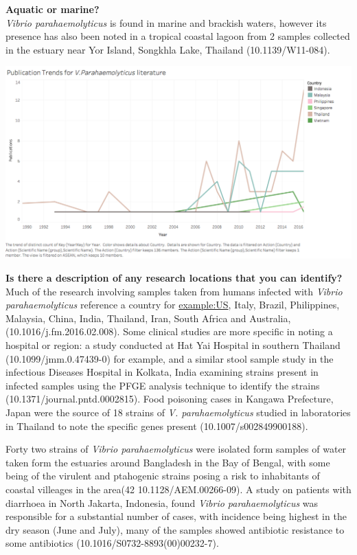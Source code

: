 \documentclass[]{book}
\theoremstyle{definition}
\theoremstyle{definition}
\theoremstyle{definition}
\theoremstyle{remark}
\begin{document}
\textbf{Aquatic or marine?}\\
\emph{Vibrio parahaemolyticus} is found in marine and brackish waters,
however its presence has also been noted in a tropical coastal lagoon
from 2 samples collected in the estuary near Yor Island, Songkhla Lake,
Thailand (10.1139/W11-084).

\includegraphics{images_species/publication trends Vibrio para.png}

\textbf{Is there a description of any research locations that you can
identify?}\\
Much of the research involving samples taken from humans infected with
\emph{Vibrio parahaemolyticus} reference a country for \url{example:US},
Italy, Brazil, Philippines, Malaysia, China, India, Thailand, Iran,
South Africa and Australia, (10.1016/j.fm.2016.02.008). Some clinical
studies are more specific in noting a hospital or region: a study
conducted at Hat Yai Hospital in southern Thailand
(10.1099/jmm.0.47439-0) for example, and a similar stool sample study in
the infectious Diseases Hospital in Kolkata, India examining strains
present in infected samples using the PFGE analysis technique to
identify the strains (10.1371/journal.pntd.0002815). Food poisoning
cases in Kangawa Prefecture, Japan were the source of 18 strains of
\emph{V. parahaemolyticus} studied in laboratories in Thailand to note
the specific genes present (10.1007/s002849900188).

Forty two strains of \emph{Vibrio parahaemolyticus} were isolated form
samples of water taken form the estuaries around Bangladesh in the Bay
of Bengal, with some being of the virulent and ptahogenic strains posing
a risk to inhabitants of coastal villeages in the area(42
10.1128/AEM.00266-09). A study on patients with diarrhoea in North
Jakarta, Indonesia, found \emph{Vibrio parahaemolyticus} was responsible
for a substantial number of cases, with incidence being highest in the
dry season (June and July), many of the samples showed antibiotic
resistance to some antibiotics (10.1016/S0732-8893(00)00232-7).
\end{document}
